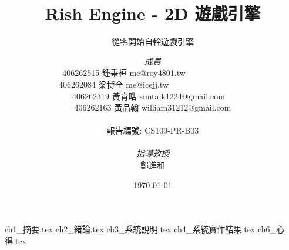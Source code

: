 \documentclass[a4paper, 12pt]{report}
\institute{輔仁大學資訊工程學系}
\title{Rish Engine - 2D 遊戲引擎}
\subtitle{從零開始自幹遊戲引擎}
\author{\textit{成員} \\
	406262515 \textsc{鍾秉桓} me@roy4801.tw\ \ \ \ \ \ \ \ \ \ \ \ \ \ \\
    406262084 \textsc{梁博全} me@icejj.tw\ \ \ \ \ \ \ \ \ \ \ \ \ \ \ \ \ \ \  \\
    406262319 \textsc{黃育晧} suntalk1224@gmail.com\ \  \\
    406262163 \textsc{黃品翰} william31212@gmail.com \\
    \ \\
    報告編號: CS109-PR-B03 \\
    \ \\
    \textit{指導教授} \\
    鄭進和
}
\date{\today}
\begin{document}
    \maketitle
    \romantableofcontents
    \listoffigures
    \listoftables

    {ch1_摘要.tex}
    {ch2_緒論.tex}
    {ch3_系統說明.tex}
    {ch4_系統實作結果.tex}
    {ch6_心得.tex}

    \printbibliography

\end{document}
